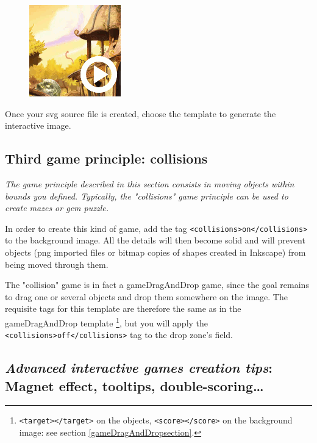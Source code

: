 \begin{figure}
  \centering
  \includegraphics[scale=0.7]{./images/gameDragAndDrop} 
\end{figure}

Once your svg source file is created, choose the template  to generate the interactive image.

\subsection{Third game principle: collisions}

\textit{The game principle described in this section consists in moving objects
within bounds you defined. Typically, the "collisions" game principle
can be used to create mazes or gem puzzle.}


In order to create this kind of game, add the tag \verb|<collisions>on</collisions>| to the 
background image. All the details will then become solid and will prevent objects 
(png imported files or bitmap copies of shapes created in Inkscape) from being moved through them.

The "collision" game is in fact a gameDragAndDrop game, since the goal remains to 
drag one or several objects and drop them somewhere on the image.
The requisite tags for this template are therefore the same as in the gameDragAndDrop template \footnote{\texttt{<target></target>} on the objects, \texttt{<score></score>} 
on the background image: see section \ref{gameDragAndDropsection}.}, but you will apply the  \verb|<collisions>off</collisions>| tag to the drop zone's  field.

\subsection{\emph{Advanced interactive games creation tips}: Magnet effect, tooltips, double-scoring\ldots}

